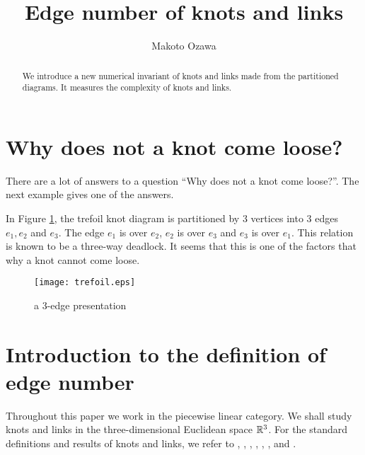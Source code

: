 \documentclass{amsart}
\theoremstyle{definition}
\theoremstyle{remark}
\numberwithin{equation}{section}
\begin{document}
\title{Edge number of knots and links}

\author{Makoto Ozawa}
\address{Department of Natural Sciences, Faculty of Arts and Sciences, Komazawa University, 1-23-1 Komazawa, Setagaya-ku, Tokyo, 154-8525, Japan}



\begin{abstract}
We introduce a new numerical invariant of knots and links made from the partitioned diagrams.
It measures the complexity of knots and links.
\end{abstract}

\maketitle

\section{Why does not a knot come loose?}

There are a lot of answers to a question ``Why does not a knot come loose?''.
The next example gives one of the answers.

In Figure \ref{trefoil}, the trefoil knot diagram is partitioned by 3 vertices into 3 edges $e_1, e_2$ and $e_3$.
The edge $e_1$ is over $e_2$, $e_2$ is over $e_3$ and $e_3$ is over $e_1$.
This relation is known to be a three-way deadlock.
It seems that this is one of the factors that why a knot cannot come loose.

\begin{figure}[htbp]
	\begin{center}
		\texttt{[image: trefoil.eps]}
	\end{center}
	\caption{a 3-edge presentation}
	\label{trefoil}
\end{figure}

\section{Introduction to the definition of edge number}

Throughout this paper we work in the piecewise linear category.
We shall study knots and links in the three-dimensional Euclidean space $\Bbb{R}^{3}$.
For the standard definitions and results of knots and links, we refer to \cite{A}, \cite{BZ}, \cite{C}, \cite{Kaw}, \cite{Lic2}, \cite{L}, \cite{M} and \cite{R}.
\end{document}
